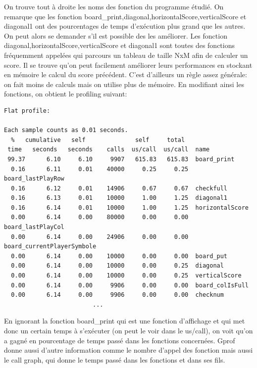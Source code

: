 \documentclass{report}
\begin{document}
On trouve tout à droite les noms des fonction du programme étudié. On remarque que les fonction board\_print,diagonal,horizontalScore,verticalScore et diagonal1 ont des pourcentages de temps d'exécution plus grand que les autres. On peut alors se demander s'il est possible des les améliorer. Les fonction diagonal,horizontalScore,verticalScore et diagonal1 sont toutes des fonctions fréquemment appelées qui parcours un tableau de taille NxM afin de calculer un score. Il se trouve qu'on peut facilement améliorer leurs performances en stockant en mémoire le calcul du score précédent. C'est d'ailleurs un règle assez générale: on fait moins de calculs mais on utilise plus de mémoire. En modifiant ainsi les fonctions, on obtient le profiling suivant:

\begin{scriptsize}
\begin{lstlisting}
Flat profile:

Each sample counts as 0.01 seconds.
  %   cumulative   self              self     total           
 time   seconds   seconds    calls  us/call  us/call  name    
 99.37      6.10     6.10     9907   615.83   615.83  board_print
  0.16      6.11     0.01    40000     0.25     0.25  board_lastPlayRow
  0.16      6.12     0.01    14906     0.67     0.67  checkfull
  0.16      6.13     0.01    10000     1.00     1.25  diagonal1
  0.16      6.14     0.01    10000     1.00     1.25  horizontalScore
  0.00      6.14     0.00    80000     0.00     0.00  board_lastPlayCol
  0.00      6.14     0.00    24906     0.00     0.00  board_currentPlayerSymbole
  0.00      6.14     0.00    10000     0.00     0.00  board_put
  0.00      6.14     0.00    10000     0.00     0.25  diagonal
  0.00      6.14     0.00    10000     0.00     0.25  verticalScore
  0.00      6.14     0.00     9906     0.00     0.00  board_colIsFull
  0.00      6.14     0.00     9906     0.00     0.00  checknum
                         ...
\end{lstlisting}
\end{scriptsize}

En ignorant la fonction board\_print qui est une fonction d'affichage et qui met donc un certain temps à s'exécuter (on peut le voir dans le us/call), on voit qu'on a gagné en pourcentage de temps passé dans les fonctions concernées. Gprof donne aussi d'autre information comme le nombre d'appel des fonction mais aussi le call graph, qui donne le temps passé dans les fonctions et dans ses fils.
\end{document}
